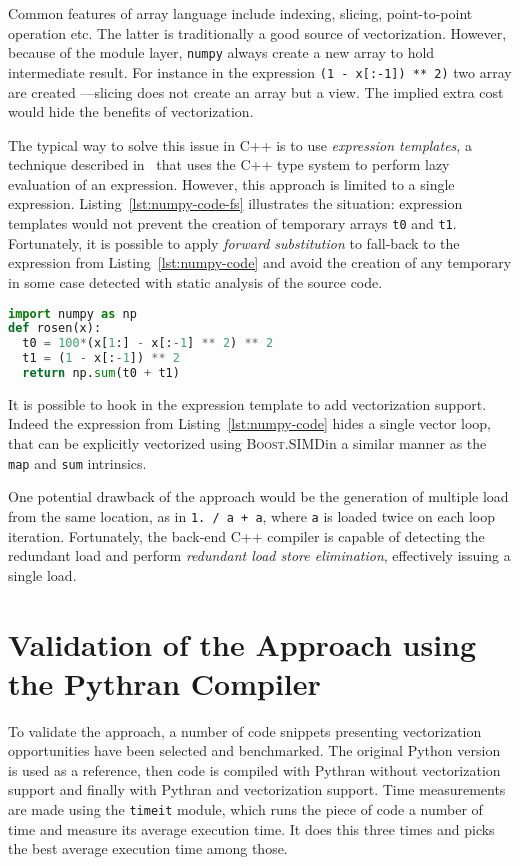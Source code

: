 \documentclass[preprint]{sigplanconf}
\providecommand{\boostsimd}{\textsc{Boost.SIMD}}
\begin{document}
Common features of array language include indexing, slicing, point-to-point
operation etc. The latter is traditionally a good source of vectorization.
However, because of the module layer, \texttt{numpy} always create a new array
to hold intermediate result. For instance in the expression \texttt{(1 -
x[:-1]) ** 2)} two array are created ---slicing does not create an array but a
view. The implied extra cost would hide the benefits of vectorization.

The typical way to solve this issue in C++ is to use \emph{expression
templates}, a technique described in~\cite{} that uses the C++ type system to
perform lazy evaluation of an expression. However, this approach is limited to
a single expression. Listing~\ref{lst:numpy-code-fs} illustrates the situation:
expression templates would not prevent the creation of temporary arrays
\texttt{t0} and \texttt{t1}. Fortunately, it is possible to apply \emph{forward
substitution} to fall-back to the expression from Listing~\ref{lst:numpy-code}
and avoid the creation of any temporary in some case detected with static analysis
of the source code.

\begin{lstlisting}[language=python, label={lst:numpy-code-fs}, caption={Sample \texttt{numpy} code requiring forward subsitution.}]
import numpy as np
def rosen(x):
  t0 = 100*(x[1:] - x[:-1] ** 2) ** 2
  t1 = (1 - x[:-1]) ** 2
  return np.sum(t0 + t1)
\end{lstlisting}

It is possible to hook in the expression template to add vectorization support.
Indeed the expression from Listing~\ref{lst:numpy-code} hides a single vector
loop, that can be explicitly vectorized using \boostsimd in a similar manner as
the \texttt{map} and \texttt{sum} intrinsics.

One potential drawback of the approach would be the generation of multiple load
from the same location, as in \texttt{1. / a + a}, where \texttt{a} is loaded
twice on each loop iteration. Fortunately, the back-end C++ compiler is capable
of detecting the redundant load and perform \emph{redundant load store
elimination}, effectively issuing a single load.

\section{Validation of the Approach using the Pythran Compiler}
\label{sec:benchs}

To validate the approach, a number of code snippets presenting vectorization
opportunities have been selected and benchmarked. The original Python version
is used as a reference, then code is compiled with Pythran without
vectorization support and finally with Pythran and vectorization support. Time
measurements are made using the \texttt{timeit} module, which runs the piece of
code a number of time and measure its average execution time. It does this
three times and picks the best average execution time among those.
\end{document}
